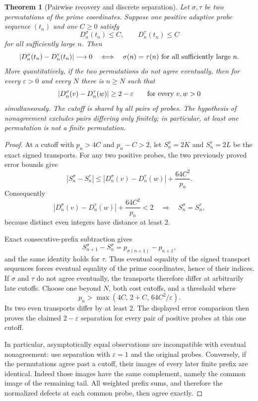 \documentclass[11pt]{article}
\newtheorem{theorem}{Theorem}[section]
\theoremstyle{definition}
\begin{document}
\begin{theorem}[Pairwise recovery and discrete separation]
Let $\sigma,\tau$ be two permutations of the prime coordinates. Suppose
one positive adaptive probe sequence $(t_n)$ and one $C\ge0$ satisfy
\[
 D_n^\sigma(t_n)\le C,\qquad D_n^\tau(t_n)\le C
\]
for all sufficiently large $n$.
Then
\[
 |D_n^\sigma(t_n)-D_n^\tau(t_n)|\longrightarrow0
 \quad\Longleftrightarrow\quad
 \sigma(n)=\tau(n)\ \hbox{for all sufficiently large }n.
\]
More quantitatively, if the two permutations do not agree eventually,
then for every $\varepsilon>0$ and every $N$ there is $n\ge N$ such that
\[
 |D_n^\sigma(v)-D_n^\tau(w)|\ge2-\varepsilon
 \qquad\hbox{for every }v,w>0
\]
simultaneously. The cutoff is shared by all pairs of probes.
The hypothesis of nonagreement excludes pairs differing only finitely;
in particular, at least one permutation is \emph{not a finite permutation}.
\end{theorem}
\begin{proof}
At a cutoff with $p_n>4C$ and $p_n-C>2$, let
$S_n^\sigma=2K$ and $S_n^\tau=2L$ be the exact signed transports.
For any two positive probes, the two previously proved error bounds give
\[
 |S_n^\sigma-S_n^\tau|
 \le |D_n^\sigma(v)-D_n^\tau(w)|+\frac{64C^2}{p_n}.
\]
Consequently
\[
 |D_n^\sigma(v)-D_n^\tau(w)|+\frac{64C^2}{p_n}<2
 \quad\Longrightarrow\quad S_n^\sigma=S_n^\tau,
\]
because distinct even integers have distance at least $2$.

Exact consecutive-prefix subtraction gives
\[
 S_{n+1}^\sigma-S_n^\sigma
   =p_{\sigma(n+1)}-p_{n+1},
\]
and the same identity holds for $\tau$.
Thus eventual equality of the signed transport sequences forces
eventual equality of the prime coordinates, hence of their indices.
If $\sigma$ and $\tau$ do not agree eventually, the transports therefore
differ at arbitrarily late cutoffs. Choose one beyond $N$, both cost
cutoffs, and a threshold where
\[
 p_n>\max(4C,\,2+C,\,64C^2/\varepsilon).
\]
Its two even transports differ by at least $2$. The displayed error
comparison then proves the claimed $2-\varepsilon$ separation for every
pair of positive probes at this one cutoff.

In particular, asymptotically equal observations are incompatible with
eventual nonagreement: use separation with $\varepsilon=1$ and the
original probes. Conversely, if the permutations agree past a cutoff,
their images of every later finite prefix are identical. Indeed those
images have the same complement, namely the common image of the
remaining tail. All weighted prefix sums, and therefore the normalized
defects at each common probe, then agree exactly.
\end{proof}
\end{document}
